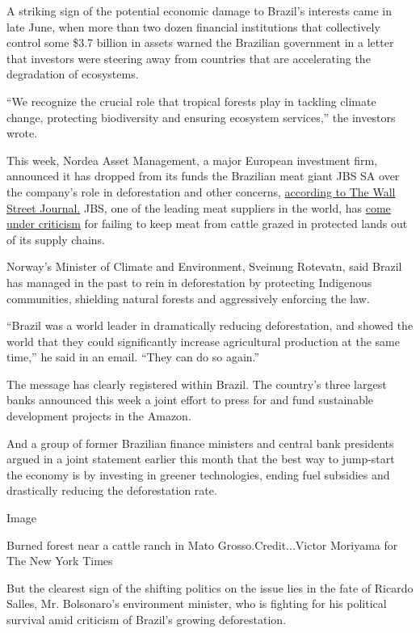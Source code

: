 A striking sign of the potential economic damage to Brazil's interests
came in late June, when more than two dozen financial institutions that
collectively control some \$3.7 billion in assets warned the Brazilian
government in a letter that investors were steering away from countries
that are accelerating the degradation of ecosystems.

``We recognize the crucial role that tropical forests play in tackling
climate change, protecting biodiversity and ensuring ecosystem
services,'' the investors wrote.

This week, Nordea Asset Management, a major European investment firm,
announced it has dropped from its funds the Brazilian meat giant JBS SA
over the company's role in deforestation and other concerns,
\href{https://www.wsj.com/articles/nordea-asset-management-drops-jbs-over-deforestation-corruption-worker-health-11595963107}{according
to The Wall Street Journal.} JBS, one of the leading meat suppliers in
the world, has
\href{https://www.nytimes3xbfgragh.onion/2019/10/10/world/americas/amazon-fires-brazil-cattle.html}{come
under criticism} for failing to keep meat from cattle grazed in
protected lands out of its supply chains.

Norway's Minister of Climate and Environment, Sveinung Rotevatn, said
Brazil has managed in the past to rein in deforestation by protecting
Indigenous communities, shielding natural forests and aggressively
enforcing the law.

``Brazil was a world leader in dramatically reducing deforestation, and
showed the world that they could significantly increase agricultural
production at the same time,'' he said in an email. ``They can do so
again.''

The message has clearly registered within Brazil. The country's three
largest banks announced this week a joint effort to press for and fund
sustainable development projects in the Amazon.

And a group of former Brazilian finance ministers and central bank
presidents argued in a joint statement earlier this month that the best
way to jump-start the economy is by investing in greener technologies,
ending fuel subsidies and drastically reducing the deforestation rate.

Image

Burned forest near a cattle ranch in Mato Grosso.Credit...Victor
Moriyama for The New York Times

But the clearest sign of the shifting politics on the issue lies in the
fate of Ricardo Salles, Mr. Bolsonaro's environment minister, who is
fighting for his political survival amid criticism of Brazil's growing
deforestation.


